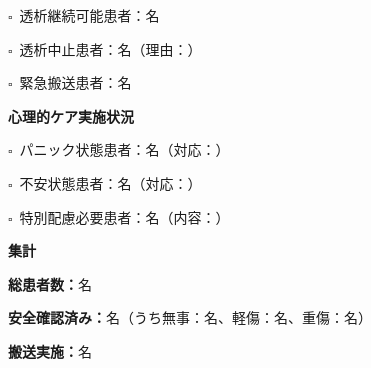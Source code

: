 \documentclass[a4paper,12pt]{jarticle}
\newcommand{\checkbox}{$\square$\ }
\newcommand{\underlinespace}[1]{\underline{\hspace{#1}}}
\begin{document}
\vspace{3mm}

\noindent
\checkbox 透析継続可能患者：\underlinespace{2cm}名

\vspace{2mm}

\noindent
\checkbox 透析中止患者：\underlinespace{2cm}名（理由：\underlinespace{6cm}）

\vspace{2mm}

\noindent
\checkbox 緊急搬送患者：\underlinespace{2cm}名

\vspace{8mm}

\begin{center}
\textbf{\large 心理的ケア実施状況}
\end{center}

\vspace{3mm}

\noindent
\checkbox パニック状態患者：\underlinespace{2cm}名（対応：\underlinespace{6cm}）

\vspace{2mm}

\noindent
\checkbox 不安状態患者：\underlinespace{2cm}名（対応：\underlinespace{6cm}）

\vspace{2mm}

\noindent
\checkbox 特別配慮必要患者：\underlinespace{2cm}名（内容：\underlinespace{6cm}）

\vspace{8mm}

\begin{center}
\textbf{\large 集計}
\end{center}

\vspace{3mm}

\noindent
\textbf{総患者数：}\underlinespace{2cm}名

\vspace{2mm}

\noindent
\textbf{安全確認済み：}\underlinespace{2cm}名（うち無事：\underlinespace{1.5cm}名、軽傷：\underlinespace{1.5cm}名、重傷：\underlinespace{1.5cm}名）

\vspace{2mm}

\noindent
\textbf{搬送実施：}\underlinespace{2cm}名

\vspace{2mm}
\end{document}
